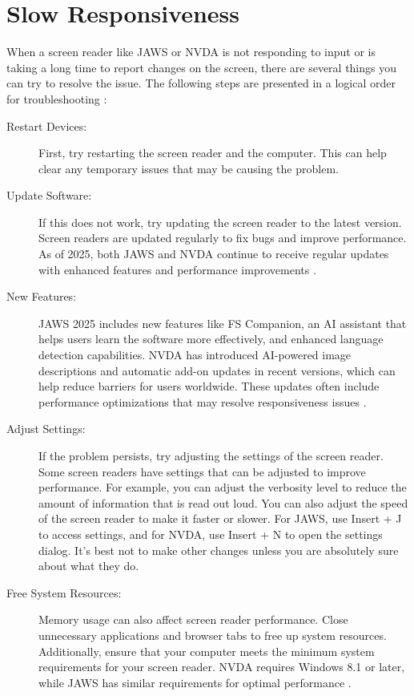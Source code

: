 \section{Slow Responsiveness}
\label{app1:response}
When a screen reader like JAWS or NVDA is not responding to input or is taking a long time to report changes on the screen, there are several things you can try to resolve the issue. The following steps are presented in a logical order for troubleshooting \cite{Fowler2011ScreenReaderLatency, Smith2022}:

\begin{description}
	\item[Restart Devices:] First, try restarting the screen reader and the computer. This can help clear any temporary issues that may be causing the problem.
	\item[Update Software:] If this does not work, try updating the screen reader to the latest version. Screen readers are updated regularly to fix bugs and improve performance. As of 2025, both JAWS and NVDA continue to receive regular updates with enhanced features and performance improvements \cite{JAWSWhatsNew, turn0search9}.
	\item[New Features:] JAWS 2025 includes new features like FS Companion, an AI assistant that helps users learn the software more effectively, and enhanced language detection capabilities. NVDA has introduced AI-powered image descriptions and automatic add-on updates in recent versions, which can help reduce barriers for users worldwide. These updates often include performance optimizations that may resolve responsiveness issues \cite{JAWSAILabeler, NarratorImageDescriptions}.
	\item[Adjust Settings:] If the problem persists, try adjusting the settings of the screen reader. Some screen readers have settings that can be adjusted to improve performance. For example, you can adjust the verbosity level to reduce the amount of information that is read out loud. You can also adjust the speed of the screen reader to make it faster or slower. For JAWS, use Insert + J to access settings, and for NVDA, use Insert + N to open the settings dialog. It's best not to make other changes unless you are absolutely sure about what they do.
	\item[Free System Resources:] Memory usage can also affect screen reader performance. Close unnecessary applications and browser tabs to free up system resources. Additionally, ensure that your computer meets the minimum system requirements for your screen reader. NVDA requires Windows 8.1 or later, while JAWS has similar requirements for optimal performance \cite{NVDARequirements, JAWSRequirements}.

\end{description}

